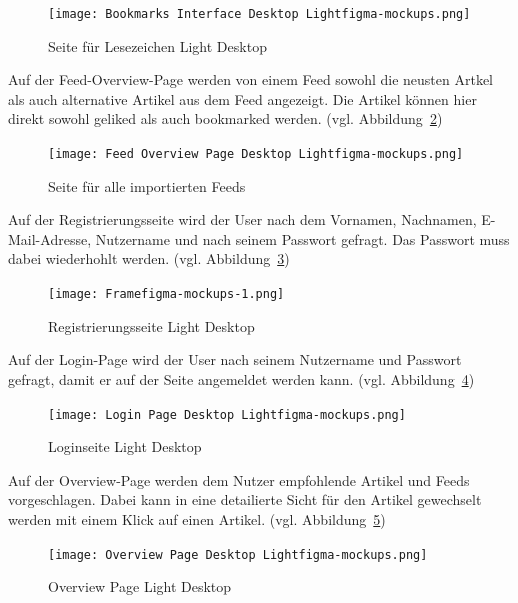 \begin{figure}[H]
    \texttt{[image: Bookmarks Interface Desktop Lightfigma-mockups.png]}
    \caption{Seite für Lesezeichen Light Desktop}
    \label{fig:Bookmarks Interface Desktop Light}
\end{figure}

Auf der Feed-Overview-Page werden von einem Feed sowohl die neusten Artkel als auch alternative Artikel aus dem Feed angezeigt.
Die Artikel können hier direkt sowohl geliked als auch bookmarked werden. (vgl. Abbildung~\ref{fig:Feed Overview Page Light Desktop})

\begin{figure}[H]
    \texttt{[image: Feed Overview Page Desktop Lightfigma-mockups.png]}
    \caption{Seite für alle importierten Feeds}
    \label{fig:Feed Overview Page Light Desktop}
\end{figure}

Auf der Registrierungsseite wird der User nach dem 
Vornamen, Nachnamen, E-Mail-Adresse, Nutzername und nach seinem Passwort gefragt. Das Passwort muss dabei wiederhohlt werden. (vgl. Abbildung~\ref{fig:Registration Page Light})

\begin{figure}[H]
    \texttt{[image: Framefigma-mockups-1.png]}
    \caption{Registrierungsseite Light Desktop}
    \label{fig:Registration Page Light}
\end{figure}

Auf der Login-Page wird der User nach seinem Nutzername und Passwort gefragt, damit er auf der Seite angemeldet werden kann. (vgl. Abbildung~\ref{fig:Login Page Desktop Light})

\begin{figure}[H]
    \texttt{[image: Login Page Desktop Lightfigma-mockups.png]}
    \caption{Loginseite Light Desktop}
    \label{fig:Login Page Desktop Light}
\end{figure}

Auf der Overview-Page werden dem Nutzer empfohlende Artikel und Feeds vorgeschlagen. Dabei kann in eine detailierte Sicht für den Artikel gewechselt werden mit einem Klick auf einen Artikel. (vgl. Abbildung~\ref{fig:Overview Page Desktop Light})

\begin{figure}[H]
    \texttt{[image: Overview Page Desktop Lightfigma-mockups.png]}
    \caption{Overview Page Light Desktop}
    \label{fig:Overview Page Desktop Light}
\end{figure}

